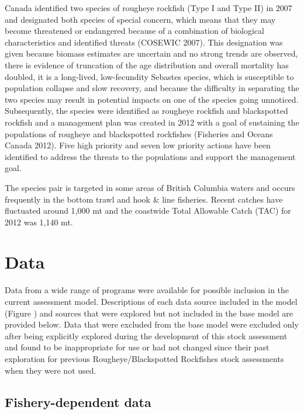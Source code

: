 \documentclass[
]{scrartcl}
\begin{document}
Canada identified two species of rougheye rockfish (Type I and Type II)
in 2007 and designated both species of special concern, which means that
they may become threatened or endangered because of a combination of
biological characteristics and identified threats (COSEWIC 2007). This
designation was given because biomass estimates are uncertain and no
strong trends are observed, there is evidence of truncation of the age
distribution and overall mortality has doubled, it is a long-lived,
low-fecundity Sebastes species, which is susceptible to population
collapse and slow recovery, and because the difficulty in separating the
two species may result in potential impacts on one of the species going
unnoticed. Subsequently, the species were identified as rougheye
rockfish and blackspotted rockfish and a management plan was created in
2012 with a goal of sustaining the populations of rougheye and
blackspotted rockfishes (Fisheries and Oceans Canada 2012). Five high
priority and seven low priority actions have been identified to address
the threats to the populations and support the management goal.

The species pair is targeted in some areas of British Columbia waters
and occurs frequently in the bottom trawl and hook \& line fisheries.
Recent catches have fluctuated around 1,000 mt and the coastwide Total
Allowable Catch (TAC) for 2012 was 1,140 mt.

\newpage{}

\section{Data}\label{data}

Data from a wide range of programs were available for possible inclusion
in the current assessment model. Descriptions of each data source
included in the model (Figure ) and sources that were explored but not
included in the base model are provided below. Data that were excluded
from the base model were excluded only after being explicitly explored
during the development of this stock assessment and found to be
inappropriate for use or had not changed since their past exploration
for previous Rougheye/Blackspotted Rockfishes stock assessments when
they were not used.

\subsection{Fishery-dependent data}\label{fishery-dependent-data}
\end{document}
